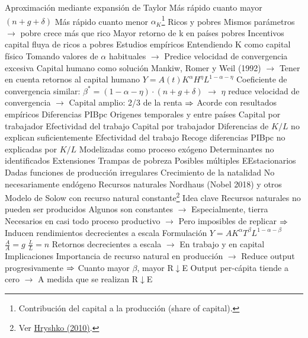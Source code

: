 \documentclass{nuevotema}
\begin{document}
\begin{esquemal}
				\4 {Aproximación mediante expansión de Taylor}
				\4[] Más rápido cuanto mayor $(n+g+\delta)$
				\4[] Más rápido cuanto menor $\alpha_K$\footnote{Contribución del capital a la producción (share of capital).}
				\4 {Ricos y pobres}
				\4[] Mismos parámetros $\rightarrow$ pobre crece más que rico
				\4[] Mayor retorno de k en países pobres
				\4[] Incentivos capital fluya de ricos a pobres
				\4 Estudios empíricos
				\4[] Entendiendo K como capital físico
				\4[] Tomando valores de $\alpha$ habituales
				\4[] $\to$ Predice velocidad de convergencia excesiva
				\4 Capital humano como solución
				\4[] Mankiw, Romer y Weil (1992)
				\4[] $\to$ Tener en cuenta retornos al capital humano
				\4[] $Y=A(t)K^\alpha H^\eta L^{1-\alpha - \eta}$
				\4[] Coeficiente de convergencia similar:
				\4[] $\beta^* = (1-\alpha-\eta)\cdot(n + g + \delta)$
				\4[] $\to$ $\eta$ reduce velocidad de convergencia
				\4[] $\to$ Capital amplio: 2/3 de la renta
				\4[] $\Rightarrow$ Acorde con resultados empíricos
			\3 Diferencias PIBpc
				\4 Origenes temporales y entre países
				\4[I] Capital por trabajador
				\4[II] Efectividad del trabajo
				\4 Capital por trabajador
				\4[] Diferencias de $K/L$ no explican suficientemente
				\4 Efectividad del trabajo
				\4[] Recoge diferencias PIBpc no explicadas por $K/L$
				\4[] Modelizadas como proceso exógeno
				\4[] Determinantes no identificados
		\2 Extensiones
			\3 Trampas de pobreza
				\4 Posibles múltiples EEstacionarios
				\4[] Dadas funciones de producción irregulares
			\3 Crecimiento de la natalidad
				\4 No necesariamente endógeno
			\3 Recursos naturales
				\4 Nordhaus (Nobel 2018) y otros
			\3 Modelo de Solow con recurso natural constante\footnote{Ver \href{http://www.artsrn.ualberta.ca/econweb/hryshko/econ403fall2010/CHAPTER9.pdf}{Hryshko (2010)}.}
				\4 Idea clave
				\4[] Recursos naturales no pueden ser producidos
				\4[] Algunos son constantes
				\4[] $\to$ Especialmente, tierra
				\4[] Necesarios en casi todo proceso productivo
				\4[] $\to$ Pero imposibles de replicar
				\4[] $\Rightarrow$ Inducen rendimientos decrecientes a escala
				\4 Formulación
				\4[] $Y = A K^\alpha T^\beta L^{1-\alpha-\beta}$
				\4[] $\frac{\dot{A}}{A} = g$
				\4[] $\frac{\dot{L}}{L} = n$
				\4[] Retornos decrecientes a escala
				\4[] $\to$ En trabajo y en capital
				\4 Implicaciones
				\4[] Importancia de recurso natural en producción
				\4[] $\to$ Reduce output progresivamente
				\4[] $\Rightarrow$ Cuanto mayor $\beta$, mayor R$\downarrow$E
				\4[] Output per-cápita tiende a cero
				\4[] $\to$ A medida que se realizan R$\downarrow$E

\end{esquemal}
\end{document}
